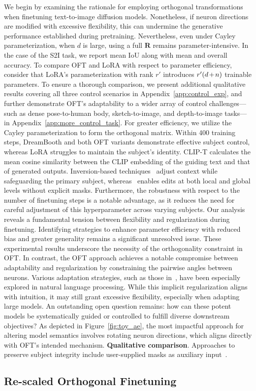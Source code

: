 {We begin by examining the rationale for employing orthogonal transformations when finetuning text-to-image diffusion models. Nonetheless, if neuron directions are modified with excessive flexibility, this can undermine the generative performance established during pretraining. Nevertheless, even under Cayley parameterization, when $d$ is large, using a full $\bm{R}$ remains parameter-intensive. In the case of the S2I task, we report mean IoU along with mean and overall accuracy. To compare OFT and LoRA with respect to parameter efficiency, consider that LoRA's parameterization with rank $r'$ introduces $\thickmuskip=2mu \medmuskip=2mu r'(d+n)$ trainable parameters. To ensure a thorough comparison, we present additional qualitative results covering all three control scenarios in Appendix~\ref{app:control_exp}, and further demonstrate OFT’s adaptability to a wider array of control challenges—such as dense pose-to-human body, sketch-to-image, and depth-to-image tasks—in Appendix~\ref{app:more_control_task}. For greater efficiency, we utilize the Cayley parameterization to form the orthogonal matrix. Within 400 training steps, DreamBooth and both OFT variants demonstrate effective subject control, whereas LoRA struggles to maintain the subject's identity. CLIP-T calculates the mean cosine similarity between the CLIP embedding of the guiding text and that of generated outputs. Inversion-based techniques~\cite{choi2021ilvr,dhariwal2021diffusion,ramesh2022hierarchical,gal2022image} adjust context while safeguarding the primary subject, whereas~\cite{hertz2022prompt} enables edits at both local and global levels without explicit masks. Furthermore, the robustness with respect to the number of finetuning steps is a notable advantage, as it reduces the need for careful adjustment of this hyperparameter across varying subjects. Our analysis reveals a fundamental tension between flexibility and regularization during finetuning. Identifying strategies to enhance parameter efficiency with reduced bias and greater generality remains a significant unresolved issue. These experimental results underscore the necessity of the orthogonality constraint in OFT. In contrast, the OFT approach achieves a notable compromise between adaptability and regularization by constraining the pairwise angles between neurons. Various adaptation strategies, such as those in~\cite{hulora2022,houlsby2019parameter,pfeiffer2020adapterfusion}, have been especially explored in natural language processing. While this implicit regularization aligns with intuition, it may still grant excessive flexibility, especially when adapting large models. An outstanding open question remains: how can these potent models be systematically guided or controlled to fulfill diverse downstream objectives? As depicted in Figure~\ref{fig:toy_ae}, the most impactful approach for altering model semantics involves rotating neuron directions, which aligns directly with OFT’s intended mechanism. \textbf{Qualitative comparison}. Approaches to preserve subject integrity include user-supplied masks as auxiliary input~\cite{avrahami2022blended,nichol2022glide}. \subsection{Re-scaled Orthogonal Finetuning}

}
